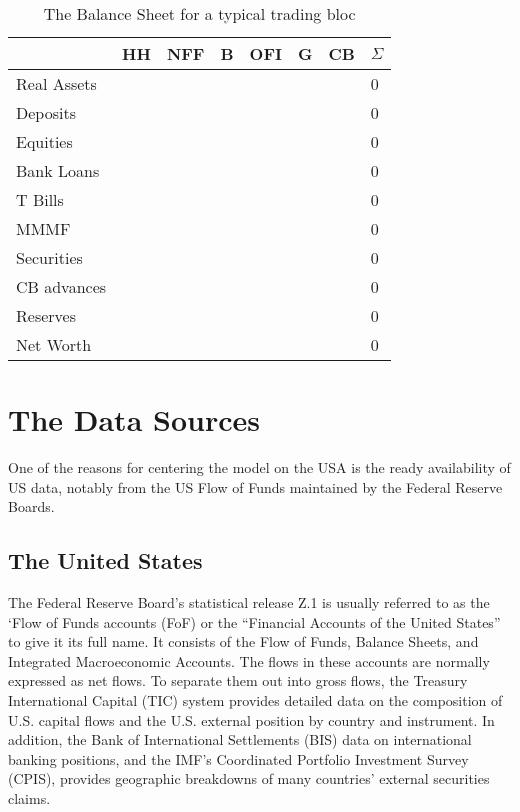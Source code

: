\documentclass[twoside,a4paper,11pt]{article}
\begin{document}
\begin{table}[h]
\begin{center}
\begin{tabular}{llllllll}
\hline
& HH & NFF & B & OFI & G & CB & $\Sigma$  \\
\hline
Real Assets &  &  &  &  &  &  & 0 \\
Deposits &  &  &  &  &  &  & 0 \\
Equities  &  &  &  &  &  &  & 0 \\
Bank Loans &  &  &  &  &  &  & 0 \\
T Bills  &  &  &  &  &  &  & 0 \\
MMMF &  &  &  &  &  &  & 0 \\
Securities  &  &  &  &  &  &  & 0 \\
CB advances  &  &  &  &  &  &  & 0 \\
Reserves  &  &  &  &  &  &  & 0 \\
Net Worth  &  &  &  &  &  &  & 0 \\
\hline
\end{tabular}
\end{center}
\caption{The Balance Sheet for a typical trading bloc}
\end{table}

\section{The Data Sources}
One of the reasons for centering the model on the USA is the ready availability of US data, notably  from the US Flow of Funds maintained by the Federal Reserve Boards.   
\subsection{The United States}
The Federal Reserve Board's statistical release Z.1 is  usually referred to as the `Flow of Funds accounts (FoF) or the ``Financial Accounts of the United States'' to give it its full name. It consists of the Flow of Funds, Balance Sheets, and Integrated Macroeconomic Accounts. The flows in these accounts are normally expressed as net flows. To separate them out into gross flows, the Treasury International Capital (TIC) system provides detailed data on the composition of U.S. capital flows and the U.S. external position by country and instrument. In addition, the Bank of International Settlements (BIS) data on international banking positions, and the IMF’s Coordinated Portfolio Investment Survey (CPIS), provides geographic breakdowns of many countries’ external securities claims.
\end{document}
